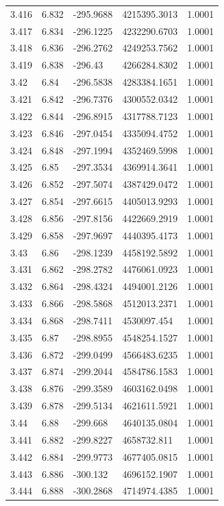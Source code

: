 \begin{tabular}{lllll}
3.416 & 6.832 & -295.9688 & 4215395.3013 & 1.0001 \\
3.417 & 6.834 & -296.1225 & 4232290.6703 & 1.0001 \\
3.418 & 6.836 & -296.2762 & 4249253.7562 & 1.0001 \\
3.419 & 6.838 & -296.43 & 4266284.8302 & 1.0001 \\
3.42 & 6.84 & -296.5838 & 4283384.1651 & 1.0001 \\
3.421 & 6.842 & -296.7376 & 4300552.0342 & 1.0001 \\
3.422 & 6.844 & -296.8915 & 4317788.7123 & 1.0001 \\
3.423 & 6.846 & -297.0454 & 4335094.4752 & 1.0001 \\
3.424 & 6.848 & -297.1994 & 4352469.5998 & 1.0001 \\
3.425 & 6.85 & -297.3534 & 4369914.3641 & 1.0001 \\
3.426 & 6.852 & -297.5074 & 4387429.0472 & 1.0001 \\
3.427 & 6.854 & -297.6615 & 4405013.9293 & 1.0001 \\
3.428 & 6.856 & -297.8156 & 4422669.2919 & 1.0001 \\
3.429 & 6.858 & -297.9697 & 4440395.4173 & 1.0001 \\
3.43 & 6.86 & -298.1239 & 4458192.5892 & 1.0001 \\
3.431 & 6.862 & -298.2782 & 4476061.0923 & 1.0001 \\
3.432 & 6.864 & -298.4324 & 4494001.2126 & 1.0001 \\
3.433 & 6.866 & -298.5868 & 4512013.2371 & 1.0001 \\
3.434 & 6.868 & -298.7411 & 4530097.454 & 1.0001 \\
3.435 & 6.87 & -298.8955 & 4548254.1527 & 1.0001 \\
3.436 & 6.872 & -299.0499 & 4566483.6235 & 1.0001 \\
3.437 & 6.874 & -299.2044 & 4584786.1583 & 1.0001 \\
3.438 & 6.876 & -299.3589 & 4603162.0498 & 1.0001 \\
3.439 & 6.878 & -299.5134 & 4621611.5921 & 1.0001 \\
3.44 & 6.88 & -299.668 & 4640135.0804 & 1.0001 \\
3.441 & 6.882 & -299.8227 & 4658732.811 & 1.0001 \\
3.442 & 6.884 & -299.9773 & 4677405.0815 & 1.0001 \\
3.443 & 6.886 & -300.132 & 4696152.1907 & 1.0001 \\
3.444 & 6.888 & -300.2868 & 4714974.4385 & 1.0001 \\

\end{tabular}
